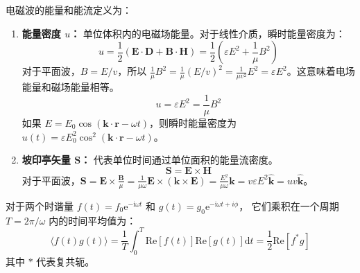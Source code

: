 \documentclass[fontset=none]{ctexart}
\begin{document}
\begin{definition}[电磁波的能量和能流]
电磁波的能量和能流定义为：
\begin{enumerate}
    \item \textbf{能量密度 $u$：} 单位体积内的电磁场能量。对于线性介质，瞬时能量密度为：
    \begin{equation}
        u = \frac{1}{2}(\bm{E} \cdot \bm{D} + \bm{B} \cdot \bm{H}) 
        = \frac{1}{2}(\varepsilon E^2 + \frac{1}{\mu} B^2)
    \end{equation}
    对于平面波，$B = E/v$，所以 $\frac{1}{\mu} B^2 = \frac{1}{\mu} (E/v)^2 
    = \frac{1}{\mu v^2} E^2 = \varepsilon E^2$。这意味着电场能量和磁场能量相等。
    \begin{equation}
        u = \varepsilon E^2 = \frac{1}{\mu} B^2
    \end{equation}
    如果 $E = E_0 \cos(\bm{k}\cdot\bm{r}-\omega t)$，则瞬时能量密度为 $u(t) 
    = \varepsilon E_0^2 \cos^2(\bm{k}\cdot\bm{r}-\omega t)$。
    
    \item \textbf{坡印亭矢量 $\bm{S}$：} 代表单位时间通过单位面积的能量流密度。
    \begin{equation}
        \bm{S} = \bm{E} \times \bm{H}
    \end{equation}
    对于平面波，$\bm{S} = \bm{E} \times \frac{\bm{B}}{\mu} 
    = \frac{1}{\mu\omega} \bm{E} \times (\bm{k} \times \bm{E}) 
    = \frac{E^2}{\mu\omega} \bm{k} = v\varepsilon E^2 \hat{\bm{k}} = u v \hat{\bm{k}}$。
\end{enumerate}
\end{definition}

\begin{theorem}[时谐场的平均值]
对于两个时谐量 $f(t) = f_0 \mathrm{e}^{-\mathrm{i}\omega t}$ 和 
$g(t) = g_0 \mathrm{e}^{-\mathrm{i}\omega t + i\phi}$，
它们乘积在一个周期 $T=2\pi/\omega$ 内的时间平均值为：
\begin{equation}
\langle f(t)g(t) \rangle 
= \frac{1}{T}\int_0^T \mathrm{Re}[f(t)]\mathrm{Re}[g(t)] \mathrm{d}t 
= \frac{1}{2}\mathrm{Re}[f^* g]
\end{equation}
其中 $*$ 代表复共轭。
\end{theorem}
\end{document}
